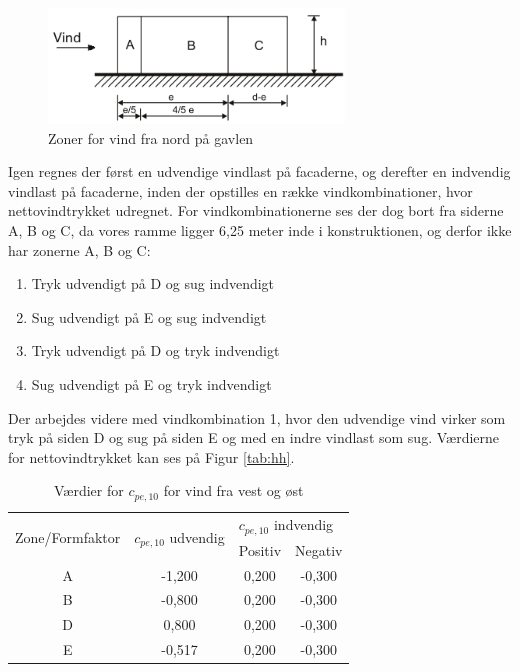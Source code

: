 \begin{figure}[htbp]
	\centering
	\includegraphics[width=0.7\textwidth]{billeder/nord.png}
	\caption{Zoner for vind fra nord på gavlen \citep[ 7.2.2]{EU91}}
	\label{fig:ac}
\end{figure}

Igen regnes der først en udvendige vindlast på facaderne, og derefter en indvendig vindlast på facaderne, inden der opstilles en række vindkombinationer, hvor nettovindtrykket udregnet. For vindkombinationerne ses der dog bort fra siderne A, B og C, da vores ramme ligger 6,25 meter inde i konstruktionen, og derfor ikke har zonerne A, B og C:
\begin{enumerate}
	\item Tryk udvendigt på D og sug indvendigt
	\item Sug udvendigt på E og sug indvendigt
	\item Tryk udvendigt på D og tryk indvendigt  
	\item Sug udvendigt på E og tryk indvendigt
\end{enumerate}

Der arbejdes videre med vindkombination 1, hvor den udvendige vind virker som tryk på siden D og sug på siden E og med en indre vindlast som sug.
\newline \indent{     }  Værdierne for nettovindtrykket kan ses på Figur \ref{tab:hh}.

\begin{table}[htb]
	\begin{center}
		\begin{tabular}{ |c|c|c|c| } 
			\hline
			\multirow{2}{*}{Zone/Formfaktor} & \multirow{2}{*}{$c_{pe,10}$ udvendig} & \multicolumn{2}{l|}{$c_{pe,10}$ indvendig} \\ \cline{3-4} 
			& & Positiv & Negativ   		\\ \hline
			A & -1,200 & 0,200 & -0,300 \\	\hline
			B & -0,800 & 0,200 & -0,300 \\	\hline 
			D & 0,800 & 0,200 & -0,300 \\	\hline
			E & -0,517 & 0,200 & -0,300 \\	\hline
		\end{tabular}
		\caption{Værdier for $c_{pe,10}$ for vind fra vest og øst}
		\label{tab:ff}
	\end{center}
\end{table}

